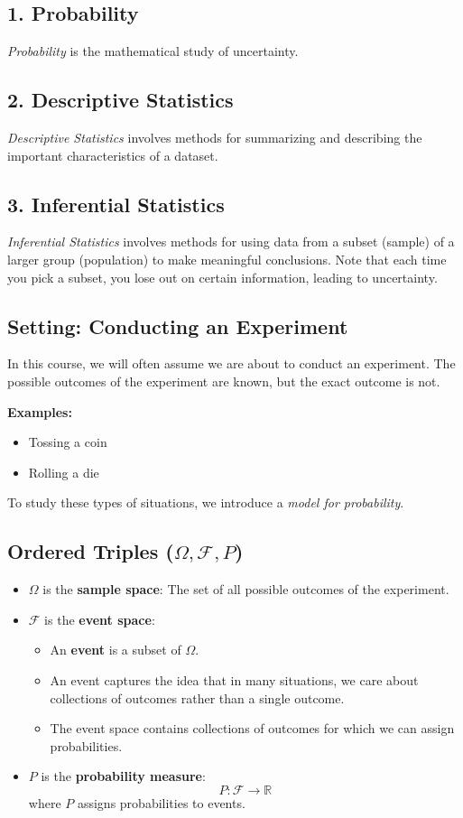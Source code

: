 \documentclass{article}
\begin{document}
\subsection*{1. Probability}
\textit{Probability} is the mathematical study of uncertainty.

\subsection*{2. Descriptive Statistics}
\textit{Descriptive Statistics} involves methods for summarizing and describing the important characteristics of a dataset.

\subsection*{3. Inferential Statistics}
\textit{Inferential Statistics} involves methods for using data from a subset (sample) of a larger group (population) to make meaningful conclusions. Note that each time you pick a subset, you lose out on certain information, leading to uncertainty.

\subsection*{Setting: Conducting an Experiment}

In this course, we will often assume we are about to conduct an experiment. The possible outcomes of the experiment are known, but the exact outcome is not.

\textbf{Examples:}
\begin{itemize}
    \item Tossing a coin
    \item Rolling a die
\end{itemize}

To study these types of situations, we introduce a \textit{model for probability}.

\subsection*{Ordered Triples (\(\Omega, \mathcal{F}, P\))}
\begin{itemize}
    \item \(\Omega\) is the \textbf{sample space}: The set of all possible outcomes of the experiment.
    \item \(\mathcal{F}\) is the \textbf{event space}:
    \begin{itemize}
        \item An \textbf{event} is a subset of \(\Omega\).
        \item An event captures the idea that in many situations, we care about collections of outcomes rather than a single outcome.
        \item The event space contains collections of outcomes for which we can assign probabilities.
    \end{itemize}
    \item \(P\) is the \textbf{probability measure}:
    \[
    P: \mathcal{F} \rightarrow \mathbb{R}
    \]
    where \(P\) assigns probabilities to events.

\end{itemize}
\end{document}
